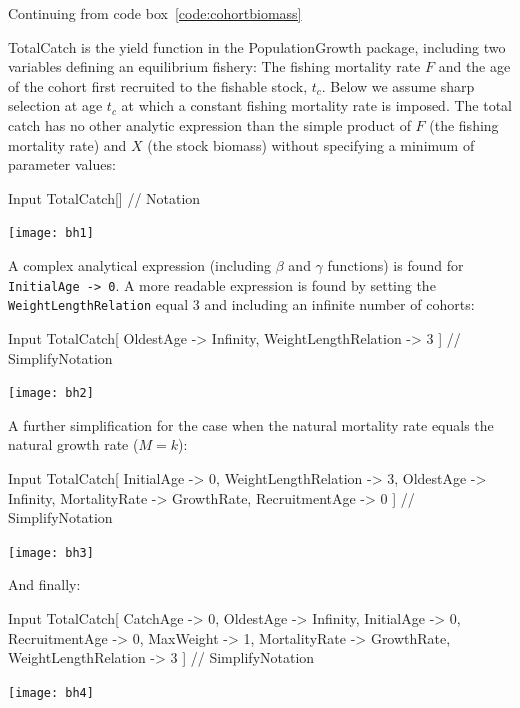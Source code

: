\documentclass[11pt,fleqn]{book} %
\begin{document}
\begin{theorem}
\hfill \break
Continuing from code box~\ref{code:cohortbiomass}

TotalCatch is the yield function in the PopulationGrowth package, including two variables defining an equilibrium fishery: The fishing mortality rate $F$ and the age of the cohort first recruited to the fishable stock, $t_c$. Below we assume sharp selection at age $t_c$ at which a constant fishing mortality rate is imposed. The total catch has no other analytic expression than the simple product of $F$ (the fishing mortality rate) and $X$ (the stock biomass) without specifying a minimum of parameter values:
\begin{mmaCell}[index=16]{Input}
  TotalCatch[] // Notation
\end{mmaCell}
\texttt{[image: bh1]}

A complex analytical expression (including $\beta$ and $\gamma$ functions) is found for \texttt{InitialAge -> 0}. A more readable expression is found by setting the \texttt{WeightLengthRelation} equal 3 and including an infinite number of cohorts:
\begin{mmaCell}{Input}
  TotalCatch[
    OldestAge            -> Infinity, 
    WeightLengthRelation -> 3
  ] // SimplifyNotation
\end{mmaCell}
\texttt{[image: bh2]}

A further simplification for the case when the natural mortality rate equals the natural growth rate ($M = k$):
\begin{mmaCell}{Input}
  TotalCatch[
    InitialAge           -> 0, 
    WeightLengthRelation -> 3,
    OldestAge            -> Infinity,
    MortalityRate        -> GrowthRate, 
    RecruitmentAge       -> 0
  ] // SimplifyNotation
\end{mmaCell}
\texttt{[image: bh3]}

And finally:
\begin{mmaCell}{Input}
  TotalCatch[
    CatchAge             -> 0, 
    OldestAge            -> Infinity,
    InitialAge           -> 0, 
    RecruitmentAge       -> 0,
    MaxWeight            -> 1, 
    MortalityRate        -> GrowthRate,
    WeightLengthRelation -> 3
  ] // SimplifyNotation
\end{mmaCell}
\texttt{[image: bh4]}


\end{theorem}
\end{document}
